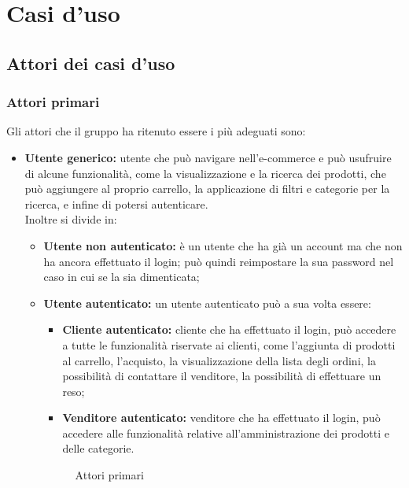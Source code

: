 \section{Casi d'uso}
    \subsection{Attori dei casi d'uso}
    \subsubsection{Attori primari}
    Gli attori che il gruppo ha ritenuto essere i più adeguati sono:
        \begin{itemize}
            \item \textbf{Utente generico:} utente che può navigare nell'e-commerce e può usufruire di alcune funzionalità, come la visualizzazione e la ricerca dei prodotti, che può aggiungere al proprio carrello, la applicazione di filtri e categorie per la ricerca, e infine di potersi autenticare.\\ Inoltre si divide in:
                \begin{itemize}
                    \item \textbf{Utente non autenticato:} è un utente che ha già un account ma che non ha ancora effettuato il login; può quindi reimpostare la sua password nel caso in cui se la sia dimenticata;
                    \item \textbf{Utente autenticato:} un utente autenticato può a sua volta essere:
                        \begin{itemize}
                            \item \textbf{Cliente autenticato:} cliente che ha effettuato il login, può accedere a tutte le funzionalità riservate ai clienti, come l'aggiunta di prodotti al carrello, l'acquisto, la visualizzazione della lista degli ordini, la possibilità di contattare il venditore, la possibilità di effettuare un reso;
                            \item \textbf{Venditore autenticato:} venditore che ha effettuato il login, può accedere alle funzionalità relative all'amministrazione dei prodotti e delle categorie.
                        \end{itemize}
                        \begin{figure}[!ht]
                            \caption{Attori primari}
                            \vspace{5px}

\end{figure}
\end{itemize}
\end{itemize}
